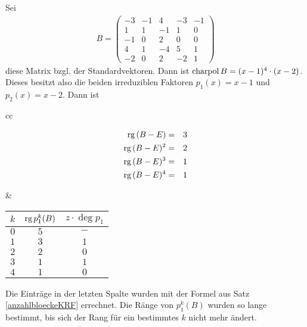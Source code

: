     Sei
    \begin{align*}
        B = 
        \begin{pmatrix}
        -3 & -1 & 4 & -3 & -1\\
        1 & 1 & -1 & 1 & 0\\
        -1 & 0 & 2 & 0 & 0\\
         4 & 1 & -4 & 5 & 1\\
        -2 & 0 & 2 & -2 & 1
        \end{pmatrix}
    \end{align*}
    diese Matrix bzgl. der Standardvektoren. Dann ist $\text{charpol}\, B = (x-1)^4 \cdot (x-2)$.
    Dieses besitzt also die beiden irreduziblen Faktoren $p_1(x) = x-1$ und $p_2(x) = x-2$. Dann ist \par\medskip
    \begin{tabular}{cc}
        \begin{minipage}{5cm}
            \begin{eqnarray*}
                \text{rg}\, (B-E) & = & 3 \\ \text{rg}\, (B-E)^2 &=&2\\ \text{rg}\, (B-E)^3 &=& 1 \\ \text{rg}\, (B-E)^4 &=& 1
            \end{eqnarray*}
        \end{minipage}
        &
        \begin{minipage}{5cm}
            \begin{tabular}{c|c|c}
                $k$  &  $\text{rg}\, p_1^k(B)$  &  $z\cdot\deg p_1$ \\ \hline
                $0$  &       $5$        &         $-$ \\
                $1$  &       $3$        &         $1$ \\
                $2$  &       $2$        &         $0$ \\
                $3$  &       $1$        &         $1$ \\
                $4$  &       $1$        &         $0$ \\
            \end{tabular}
        \end{minipage}
    \end{tabular} \par \medskip 

    Die Einträge in der letzten Spalte wurden mit der Formel aus Satz \ref{anzahlbloeckeKRF} errechnet.
    Die Ränge von $p_1^k(B)$ wurden so lange bestimmt, bis sich der Rang für ein bestimmtes $k$ nicht mehr ändert.

